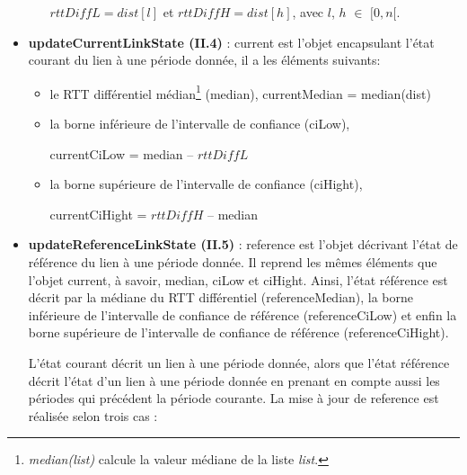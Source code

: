 \begin{itemize}
\begin{enumerate}
		$ rttDiffL  = dist[l]$  et $ rttDiffH = dist[h]$, avec $l$, $h$ $\in$ $[0,n[$. 
		
	\end{enumerate}
	
	
	\item \textbf{updateCurrentLinkState (II.4)} :  {\color{gray}current}  est l'objet encapsulant  l'état courant du lien à une période donnée, il a
	les éléments suivants:
	
	\begin{itemize}[label=$\square$]
		\item le RTT différentiel médian\footnote{\textit{median(list)} calcule la valeur médiane de la liste \textit{list}. } ({\color{gray}median}),
		{\color{gray}currentMedian} = median(dist) 
		
		\item  la borne inférieure de l'intervalle de confiance ({\color{gray}ciLow}),
		
		{\color{gray}currentCiLow} = {\color{gray}median} --  $ rttDiffL $
		
		\item   la borne supérieure de l'intervalle de confiance ({\color{gray}ciHight}),
		
		{\color{gray}currentCiHight} =  $ rttDiffH$ --  {\color{gray}median}
		
	\end{itemize}
	
	\item \textbf{ updateReferenceLinkState (II.5)} :  {\color{gray}reference}  est l'objet décrivant l'état de référence du lien à une période donnée. Il reprend les mêmes éléments que  l'objet {\color{gray}current}, à savoir, {\color{gray}median}, {\color{gray}ciLow} et {\color{gray}ciHight}. Ainsi, l'état référence est décrit par la médiane du RTT différentiel ({\color{gray}referenceMedian}), la borne inférieure de l'intervalle de confiance de référence ({\color{gray}referenceCiLow}) et enfin la borne supérieure de l'intervalle de confiance de référence ({\color{gray}referenceCiHight}).
	
	L'état courant décrit un lien à une période donnée, alors que l'état référence décrit l'état d'un lien à une période donnée en prenant en compte aussi les périodes qui précédent la période courante. La mise à jour de {\color{gray}reference}  est réalisée selon trois cas :
	

\end{itemize}
